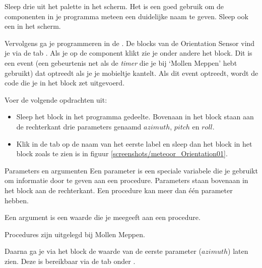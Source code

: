 \begin{opgave}
    \opgVraag
  Sleep drie  uit het  palette in het scherm. Het is een goed gebruik om de componenten in je programma meteen een duidelijke naam te geven. Sleep ook een  in het scherm.
\end{opgave}

Vervolgens ga je programmeren in de . De blocks van de Orientation Sensor vind je via de tab . Als je op de  component klikt zie je onder andere het  block. Dit is een event (een gebeurtenis net als de \emph{timer} die je bij `Mollen Meppen' hebt gebruikt) dat optreedt als je je mobieltje kantelt. Als dit event optreedt, wordt de code die je in het  block zet uitgevoerd. 

\begin{opgave}
    \opgVraag
  Voer de volgende opdrachten uit:
  \begin{itemize}
    \item Sleep het  block in het programma gedeelte. Bovenaan in het block staan aan de rechterkant drie parameters genaamd $azimuth$, $pitch$ en $roll$.
    \item Klik in de tab  op de naam van het eerste label en sleep dan het  block in het  block zoals te zien is in figuur \ref{screenshots/meteoor_Orientation01}.
  \end{itemize}
\end{opgave}


\begin{derivation}{Parameters en argumenten}
Een parameter is een speciale variabele die je gebruikt om informatie door te geven aan een procedure. Parameters staan bovenaan in het block aan de rechterkant. Een procedure kan meer dan \'e\'en parameter hebben.

Een argument is een waarde die je meegeeft aan een procedure.

Procedures zijn uitgelegd bij Mollen Meppen.
\end{derivation}

Daarna ga je via het  block de waarde van de eerste parameter ($azimuth$) laten zien. Deze is bereikbaar via de  tab onder .

